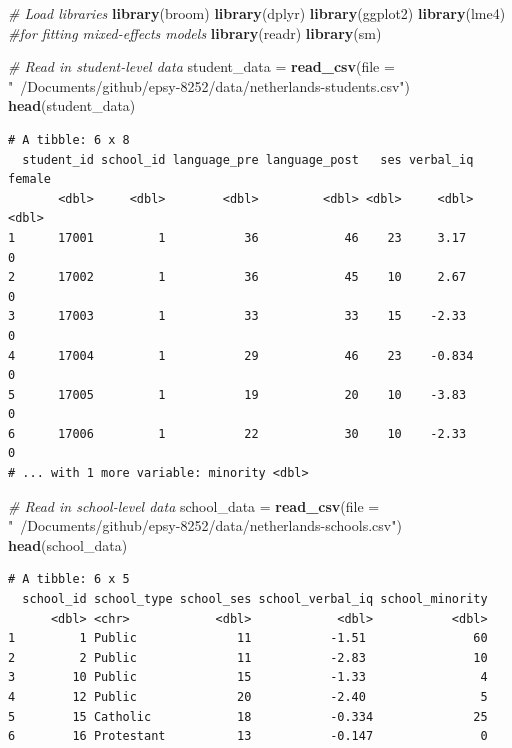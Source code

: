 \documentclass[]{book}
\newenvironment{Shaded}{\begin{snugshade}}{\end{snugshade}}
\newcommand{\CommentTok}[1]{\textcolor[rgb]{0.56,0.35,0.01}{\textit{#1}}}
\newcommand{\DataTypeTok}[1]{\textcolor[rgb]{0.13,0.29,0.53}{#1}}
\newcommand{\KeywordTok}[1]{\textcolor[rgb]{0.13,0.29,0.53}{\textbf{#1}}}
\newcommand{\NormalTok}[1]{#1}
\newcommand{\StringTok}[1]{\textcolor[rgb]{0.31,0.60,0.02}{#1}}
\begin{document}
\begin{Shaded}
\begin{Highlighting}[]
\CommentTok{# Load libraries}
\KeywordTok{library}\NormalTok{(broom)}
\KeywordTok{library}\NormalTok{(dplyr)}
\KeywordTok{library}\NormalTok{(ggplot2)}
\KeywordTok{library}\NormalTok{(lme4) }\CommentTok{#for fitting mixed-effects models}
\KeywordTok{library}\NormalTok{(readr)}
\KeywordTok{library}\NormalTok{(sm)}

\CommentTok{# Read in student-level data}
\NormalTok{student_data =}\StringTok{ }\KeywordTok{read_csv}\NormalTok{(}\DataTypeTok{file =} \StringTok{"~/Documents/github/epsy-8252/data/netherlands-students.csv"}\NormalTok{)}
\KeywordTok{head}\NormalTok{(student_data)}
\end{Highlighting}
\end{Shaded}

\begin{verbatim}
# A tibble: 6 x 8
  student_id school_id language_pre language_post   ses verbal_iq female
       <dbl>     <dbl>        <dbl>         <dbl> <dbl>     <dbl>  <dbl>
1      17001         1           36            46    23     3.17       0
2      17002         1           36            45    10     2.67       0
3      17003         1           33            33    15    -2.33       0
4      17004         1           29            46    23    -0.834      0
5      17005         1           19            20    10    -3.83       0
6      17006         1           22            30    10    -2.33       0
# ... with 1 more variable: minority <dbl>
\end{verbatim}

\begin{Shaded}
\begin{Highlighting}[]
\CommentTok{# Read in school-level data}
\NormalTok{school_data =}\StringTok{ }\KeywordTok{read_csv}\NormalTok{(}\DataTypeTok{file =} \StringTok{"~/Documents/github/epsy-8252/data/netherlands-schools.csv"}\NormalTok{)}
\KeywordTok{head}\NormalTok{(school_data)}
\end{Highlighting}
\end{Shaded}

\begin{verbatim}
# A tibble: 6 x 5
  school_id school_type school_ses school_verbal_iq school_minority
      <dbl> <chr>            <dbl>            <dbl>           <dbl>
1         1 Public              11           -1.51               60
2         2 Public              11           -2.83               10
3        10 Public              15           -1.33                4
4        12 Public              20           -2.40                5
5        15 Catholic            18           -0.334              25
6        16 Protestant          13           -0.147               0
\end{verbatim}
\end{document}
